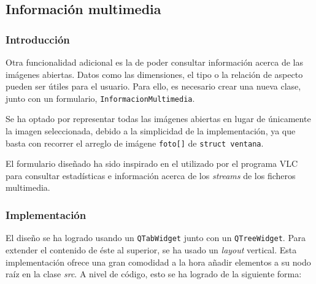 \documentclass[11pt]{article}
\begin{document}
          \clearpage

  \subsection{Información multimedia}

      \subsubsection{Introducción}

          \noindent
          Otra funcionalidad adicional es la de poder consultar información acerca de las imágenes abiertas. Datos como las dimensiones, el tipo o la relación de aspecto pueden ser útiles para el usuario. Para ello, es necesario crear una nueva clase, junto con un formulario, \texttt{InformacionMultimedia}.

          \begin{info}[Observación]
              Se ha optado por representar todas las imágenes abiertas en lugar de únicamente la imagen seleccionada, debido a la simplicidad de la implementación, ya que basta con recorrer el arreglo de imágene \texttt{foto[]} de \texttt{struct ventana}.
          \end{info}

          El formulario diseñado ha sido inspirado en el utilizado por el programa VLC
          para consultar estadísticas e información acerca de los \textit{streams} de los
          ficheros multimedia.

      \subsubsection{Implementación}

          El diseño se ha logrado usando un \texttt{QTabWidget} junto con un
          \texttt{QTreeWidget}. Para extender el contenido de éste al superior, se ha
          usado un \textit{layout} vertical. Esta implementación ofrece una gran
          comodidad a la hora añadir elementos a su nodo raíz en la clase \textit{src}. A
          nivel de código, esto se ha logrado de la siguiente forma:
\end{document}
